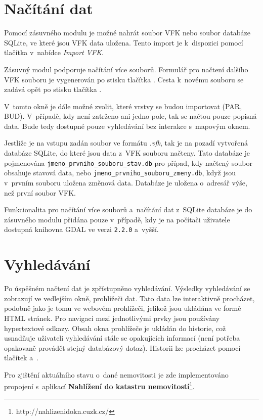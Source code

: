 \documentclass[a4paper,12pt,oneside]{book}
\begin{document}
\section{Načítání dat}
Pomocí zásuvného modulu je možné nahrát soubor VFK nebo soubor
databáze SQLite, ve které jsou VFK data uložena. Tento import je
k~dispozici pomocí tlačítka  v~nabídce \textit{Import
  VFK}.

Zásuvný modul podporuje načítání více souborů. Formulář pro načtení
dalšího VFK souboru je vygenerován po stisku tlačítka \uv{+}. Cesta
k~novému souboru se zadává opět po stisku tlačítka .

V~tomto okně je dále možné zvolit, které vrstvy se budou importovat
(PAR, BUD). V~případě, kdy není zatrženo ani jedno pole, tak se načtou
pouze popisná data. Bude tedy dostupné pouze vyhledávání bez interakce
s~mapovým oknem.

Jestliže je na vstupu zadán soubor ve formátu \textit{.vfk}, tak je na
pozadí vytvořená databáze SQLite, do které jsou data z~VFK souboru
načteny. Tato databáze je pojmenována
\texttt{jmeno\_prvniho\_souboru\_stav.db} pro případ, kdy načtený
soubor obsahuje stavová data, nebo
\texttt{jmeno\_prvniho\_souboru\_zmeny.db}, když jsou v~prvním souboru
uložena změnová data. Databáze je uložena o~adresář výše, než první
soubor VFK.

Funkcionalita pro načítání více souborů a~načítání dat z~SQLite
databáze je do zásuvného modulu přidána pouze v~případě, kdy je na
počítači uživatele dostupná knihovna GDAL ve verzi \texttt{2.2.0}
a~vyšší.

\section{Vyhledávání}
Po úspěšném načtení dat je zpřístupněno vyhledávání. Výsledky
vyhledávání se zobrazují ve vedlejším okně, prohlížeči dat. Tato data
lze interaktivně procházet, podobně jako je tomu ve webovém
prohlížeči, jelikož jsou ukládána ve formě HTML stránek. Pro navigaci
mezi jednotlivými prvky jsou používány hypertextové odkazy. Obsah okna
prohlížeče je ukládán do historie, což usnadňuje uživateli vyhledávání
stále se opakujících informací (není potřeba opakovaně provádět stejný
databázový dotaz). Historii lze procházet pomocí tlačítek 
a~.

Pro zjištění aktuálního stavu o~dané nemovitosti je zde implementováno
propojení s~aplikací \textbf{Nahlížení do katastru
  nemovitostí}\footnote{http://nahlizenidokn.cuzk.cz/}.
\end{document}
